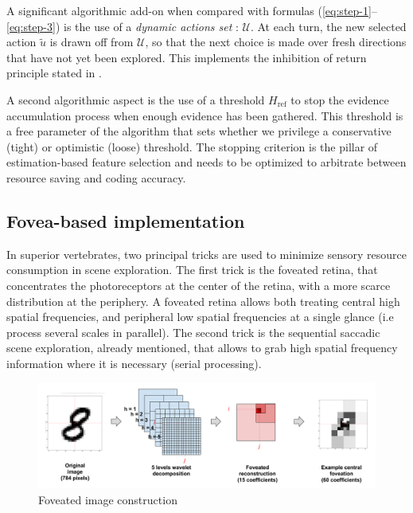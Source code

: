 \documentclass{article} %
\begin{document}
A significant algorithmic add-on when compared with formulas (\ref{eq:step-1}--\ref{eq:step-3}) is the use of a \emph{dynamic actions set} : $\mathcal{U}$. At each turn, the new selected action $\tilde{u}$ is drawn off from $\mathcal{U}$, so that the next choice is made over fresh directions that have not yet been explored. This implements the inhibition of return principle stated in \cite{itti2001computational}.

A second algorithmic aspect is the use of a threshold $H_\text{ref}$ to stop the evidence accumulation process when enough evidence has been gathered. This threshold is a free parameter of the algorithm that sets whether we privilege a conservative (tight) or optimistic (loose) threshold. The stopping criterion is the pillar of estimation-based feature selection and needs to be optimized to arbitrate between resource saving and coding accuracy. 




\subsection{Fovea-based implementation}

In superior vertebrates, two principal tricks are used to minimize sensory resource consumption in scene exploration. The first trick is the foveated retina, that concentrates the photoreceptors at the center of the retina, with a more scarce distribution at the periphery. A foveated retina allows both treating central high spatial frequencies, and peripheral low spatial frequencies at a single glance (i.e process several scales in parallel). The second trick is the sequential saccadic scene exploration, already mentioned, that allows to grab high spatial frequency information where it is necessary (serial processing). 


\begin{figure}[t!]
	\centerline{
		\includegraphics[width = \linewidth]{img/ICLR-foveated-model.png} 
	}
	\caption{Foveated image construction}\label{fig:foveated}
\end{figure}
\end{document}
